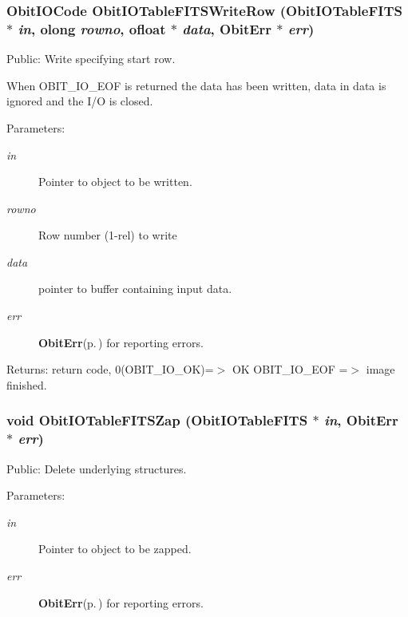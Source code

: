 \subsubsection{\setlength{\rightskip}{0pt plus 5cm}Obit\-IOCode Obit\-IOTable\-FITSWrite\-Row ({\bf Obit\-IOTable\-FITS} $\ast$ {\em in}, {\bf olong} {\em rowno}, {\bf ofloat} $\ast$ {\em data}, {\bf Obit\-Err} $\ast$ {\em err})}\label{ObitIOTableFITS_8h_a15}


Public: Write specifying start row. 

When OBIT\_\-IO\_\-EOF is returned the data has been written, data in data is ignored and the I/O is closed. \begin{Desc}
\item[Parameters:]
\begin{description}
\item[{\em in}]Pointer to object to be written. \item[{\em rowno}]Row number (1-rel) to write \item[{\em data}]pointer to buffer containing input data. \item[{\em err}]{\bf Obit\-Err}{\rm (p.\,\pageref{structObitErr})} for reporting errors. \end{description}
\end{Desc}
\begin{Desc}
\item[Returns:]return code, 0(OBIT\_\-IO\_\-OK)=$>$ OK OBIT\_\-IO\_\-EOF =$>$ image finished. \end{Desc}
\subsubsection{\setlength{\rightskip}{0pt plus 5cm}void Obit\-IOTable\-FITSZap ({\bf Obit\-IOTable\-FITS} $\ast$ {\em in}, {\bf Obit\-Err} $\ast$ {\em err})}\label{ObitIOTableFITS_8h_a7}


Public: Delete underlying structures. 

\begin{Desc}
\item[Parameters:]
\begin{description}
\item[{\em in}]Pointer to object to be zapped. \item[{\em err}]{\bf Obit\-Err}{\rm (p.\,\pageref{structObitErr})} for reporting errors. \end{description}
\end{Desc}
